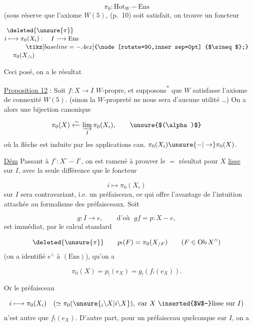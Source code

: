 \[
\pi_0:\mathrm{Hot}_W-\mathrm{Ens}
\]
(sous réserve que l'axiome  $W(5)$,  (p.~10) soit satisfait,
on trouve un foncteur

\[
\begin{aligned}
&\deleted{\unsure{\pi}}\\[-2pt]
i&\longmapsto\pi_0(X_i):\quad I\longrightarrow\mathrm{Ens}\\[-2pt]
&\hspace{3em}\tikz[baseline=-.4ex]{\node[rotate=90,inner sep=0pt] {$\simeq$};}\\[-2pt]
&\hspace{1em}\pi_0(X_{/i})
\end{aligned}
\]

Ceci posé, on a le résultat 

\uline{Proposition 12} : Soit $f:X\longrightarrow I$ $W$-propre, et supposons\textsuperscript{*} que $W$ satisfasse l'axiome de connexité $W(5)$. (sinon la $W$-propreté ne nous sera d'aucune utilité \ldots) On a alors une bijection canonique

\[
\pi_0(X)\xleftarrow{\sim}\underset{I}{\varinjlim}\,\pi_0(X_i),\tag*{\unsure{$(\alpha)$}}
\]
où la flèche est induite par les applications can. $\pi_0(X_i)\unsure{-|\to}\pi_0(X)$.

\uline{Dém} Passant à $f^\circ:X^\circ-I^\circ$, on est ramené à prouver le $=$ résultat pour $X$ \uline{lisse} sur $I$, avec la seule différence que le foncteur

\[
i\longmapsto\pi_0(X_i)
\]
sur $I$ sera contravariant, i.e. un préfaisceau, ce qui offre l'avantage de l'intuition attachée au formalisme des préfaisceaux. Soit

\[
g:I\longrightarrow e,\qquad\text{d'où }\;gf=p:X-e,
\]
 est immédiat, par le calcul standard

\[
\deleted{\unsure{\pi}}\qquad p_!(F)=\pi_0(X_{/F})\qquad(F\in\mathrm{Ob}\,X^\wedge)
\]
 (on a identifié $e^\wedge$ à $(\mathrm{Ens})$), qu'on a

\[
\pi_0(X)=p_!(e_X)=g_!(f_!(e_X)).
\]

Or le préfaisceau

\[
i\longmapsto\pi_0(X_i)\quad(\simeq\pi_0(\unsure{{}_i\backslash X|i\backslash X}),\ \text{car }X\text{ \inserted{$W$-}lisse sur }I)
\]
n'est autre que $f_!(e_X)$. D'autre part, pour un préfaisceau quelconque  sur $I$, on a

